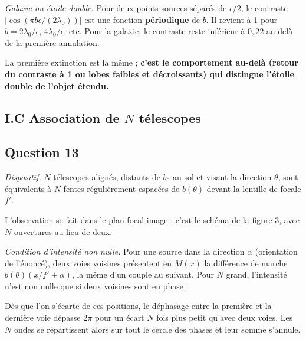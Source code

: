 \documentclass[11pt,a4paper]{article}
\newcommand{\equationajustee}[1]{%
  \sbox{\boiteequation}{$\displaystyle #1$}%
  \ifdim\wd\boiteequation>\linewidth
    \[\resizebox{\linewidth}{!}{\usebox{\boiteequation}}\]%
  \else
    \[#1\]%
  \fi}
\begin{document}
\emph{Galaxie ou étoile double.} Pour deux points sources séparés de \(\epsilon/2\), le contraste \(\left|\cos\left(\pi b\epsilon/(2\lambda_0)\right)\right|\) est une fonction \textbf{périodique} de \(b\). Il revient à 1 pour \(b=2\lambda_0/\epsilon\), \(4\lambda_0/\epsilon\), etc. Pour la galaxie, le contraste reste inférieur à \(0{,}22\) au-delà de la première annulation.

La première extinction est la même ; \textbf{c'est le comportement au-delà (retour du contraste à 1 ou lobes faibles et décroissants) qui distingue l'étoile double de l'objet étendu.}

\hypertarget{i.c-association-de-n-tuxe9lescopes}{%
\subsection{\texorpdfstring{I.C Association de \(N\) télescopes}{I.C Association de N télescopes}}\label{i.c-association-de-n-tuxe9lescopes}}

\hypertarget{question-13}{%
\subsection{Question 13}\label{question-13}}

\emph{Dispositif.} \(N\) télescopes alignés, distants de \(b_0\) au sol et visant la direction \(\theta\), sont équivalents à \(N\) fentes régulièrement espacées de \(b(\theta)\) devant la lentille de focale \(f'\).

L'observation se fait dans le plan focal image : c'est le schéma de la figure 3, avec \(N\) ouvertures au lieu de deux.

\emph{Condition d'intensité non nulle.} Pour une source dans la direction \(\alpha\) (orientation de l'énoncé), deux voies voisines présentent en \(M(x)\) la différence de marche \(b(\theta)(x/f'+\alpha)\), la même d'un couple au suivant. Pour \(N\) grand, l'intensité n'est non nulle que si deux voisines sont en phase :

\equationajustee{\begin{aligned}
\frac{b(\theta)}{\lambda_0}\left(\frac{x}{f'}+\alpha\right)&=p\in\mathbb Z\\
x&=f'\left(p\frac{\lambda_0}{b(\theta)}-\alpha\right)
\end{aligned}}

Dès que l'on s'écarte de ces positions, le déphasage entre la première et la dernière voie dépasse \(2\pi\) pour un écart \(N\) fois plus petit qu'avec deux voies. Les \(N\) ondes se répartissent alors sur tout le cercle des phases et leur somme s'annule.
\end{document}
